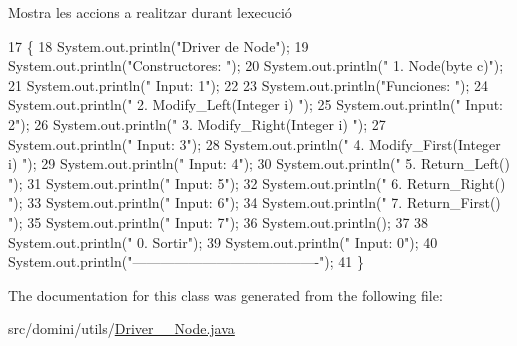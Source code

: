 Mostra les accions a realitzar durant l\textquotesingle{}execució 


\begin{DoxyCode}
17                                      \{
18         System.out.println(\textcolor{stringliteral}{"Driver de Node"});
19         System.out.println(\textcolor{stringliteral}{"Constructores: "});
20         System.out.println(\textcolor{stringliteral}{"     1. Node(byte c)"});
21         System.out.println(\textcolor{stringliteral}{"     Input: 1"});
22 
23         System.out.println(\textcolor{stringliteral}{"Funciones: "});
24         System.out.println(\textcolor{stringliteral}{"     2. Modify\_Left(Integer i) "});
25         System.out.println(\textcolor{stringliteral}{"     Input: 2"});
26         System.out.println(\textcolor{stringliteral}{"     3. Modify\_Right(Integer i) "});
27         System.out.println(\textcolor{stringliteral}{"     Input: 3"});
28         System.out.println(\textcolor{stringliteral}{"     4. Modify\_First(Integer i) "});
29         System.out.println(\textcolor{stringliteral}{"     Input: 4"});
30         System.out.println(\textcolor{stringliteral}{"     5. Return\_Left() "});
31         System.out.println(\textcolor{stringliteral}{"     Input: 5"});
32         System.out.println(\textcolor{stringliteral}{"     6. Return\_Right() "});
33         System.out.println(\textcolor{stringliteral}{"     Input: 6"});
34         System.out.println(\textcolor{stringliteral}{"     7. Return\_First() "});
35         System.out.println(\textcolor{stringliteral}{"     Input: 7"});
36         System.out.println();
37 
38         System.out.println(\textcolor{stringliteral}{"     0. Sortir"});
39         System.out.println(\textcolor{stringliteral}{"     Input: 0"});
40         System.out.println(\textcolor{stringliteral}{"----------------------------------------"});
41     \}
\end{DoxyCode}


The documentation for this class was generated from the following file\+:\begin{DoxyCompactItemize}
\item 
src/domini/utils/\hyperlink{Driver____Node_8java}{Driver\+\_\+\+\_\+\+Node.\+java}\end{DoxyCompactItemize}
